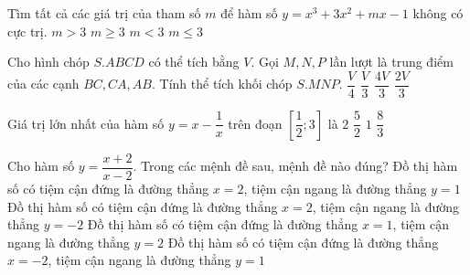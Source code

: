 \begin{ex}%
	Tìm tất cả các giá trị của tham số $m$ để hàm số $y=x^3+3x^2+mx-1$ không có cực trị.
	\choice
	{$m>3$}
	{\True $m\geq 3$}
	{$m<3$}
	{$m\leq 3$}
\end{ex}


\begin{ex}%
	Cho hình chóp $S.ABCD$ có thể tích bằng $V$. Gọi $M, N, P$ lần lượt là trung điểm của các cạnh $BC, CA, AB$. Tính thể tích khối chóp $S.MNP$.
	\choice
	{\True $\dfrac{V}{4}$}
	{$\dfrac{V}{3}$}
	{$\dfrac{4V}{3}$}
	{$\dfrac{2V}{3}$}
	
\end{ex}


\begin{ex}%
	Giá trị lớn nhất của hàm số $y=x-\dfrac{1}{x}$ trên đoạn $\left[\dfrac{1}{2}; 3\right]$ là	
	\choice
	{$2$}
	{$\dfrac{5}{2}$}
	{$1$}
	{\True $\dfrac{8}{3}$}
\end{ex}


\begin{ex}%
	Cho hàm số $y=\dfrac{x+2}{x-2}$. Trong các mệnh đề sau, mệnh đề nào đúng?
	\choice
	{\True Đồ thị hàm số có tiệm cận đứng là đường thẳng $x=2$, tiệm cận ngang là đường thẳng $y=1$}
	{Đồ thị hàm số có tiệm cận đứng là đường thẳng $x=2$, tiệm cận ngang là đường thẳng $y=-2$}
	{Đồ thị hàm số có tiệm cận đứng là đường thẳng $x=1$, tiệm cận ngang là đường thẳng $y=2$}
	{Đồ thị hàm số có tiệm cận đứng là đường thẳng $x=-2$, tiệm cận ngang là đường thẳng $y=1$}
\end{ex}


